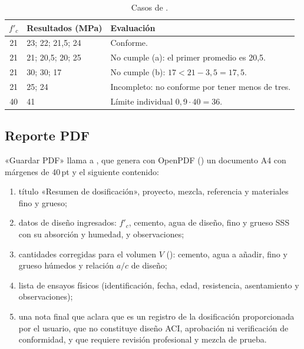 \begin{table}[H]
	\centering
	\caption{Casos de .}
	\label{tab:con-ejemplo-evaluacion}
	\begin{tabular}{cL{4.2cm}L{7.4cm}}
		\hline
		\textbf{$f'_c$} & \textbf{Resultados (MPa)} & \textbf{Evaluación} \\  & 23; 22; 21,5; 24 & Conforme. \\
		21 & 21; 20,5; 20; 25 & No cumple (a): el primer promedio es 20,5. \\
		21 & 30; 30; 17 & No cumple (b): $17 < 21 - 3{,}5 = 17{,}5$. \\
		21 & 25; 24 & Incompleto: no conforme por tener menos de tres. \\
		40 & 41 & Límite individual $0{,}9 \cdot 40 = 36$. \\
		\hline
	\end{tabular}
\end{table}

\subsection{Reporte PDF}
\label{sec:con-pdf}

«Guardar PDF» llama a , que genera con OpenPDF
() un documento A4 con márgenes de 40\,pt y el siguiente contenido:

\begin{enumerate}
	\item título «Resumen de dosificación», proyecto, mezcla, referencia y materiales fino y grueso;
	\item datos de diseño ingresados: $f'_c$, cemento, agua de diseño, fino y grueso SSS con su absorción y humedad, y
	      observaciones;
	\item cantidades corregidas para el volumen $V$ (): cemento, agua a añadir,
	      fino y grueso húmedos y relación $a/c$ de diseño;
	\item lista de ensayos físicos (identificación, fecha, edad, resistencia, asentamiento y observaciones);
	\item una nota final que aclara que es un registro de la dosificación proporcionada por el usuario, que no
	      constituye diseño ACI, aprobación ni verificación de conformidad, y que requiere revisión profesional y mezcla
	      de prueba.
\end{enumerate}

